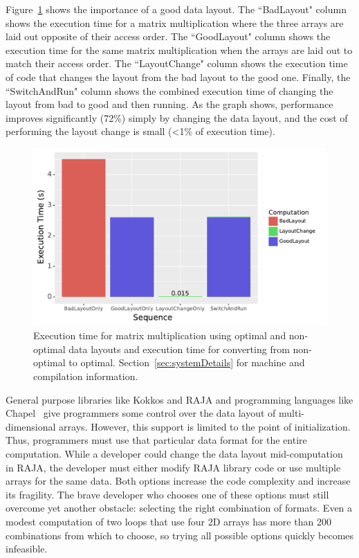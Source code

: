 \documentclass[sigconf,review=true]{acmart}
\begin{document}
Figure~\ref{IntroExample} shows the importance of a good data layout. 
The ``BadLayout" column shows the execution time for a matrix multiplication where the three arrays are laid out opposite of their access order. 
The ``GoodLayout" column shows the execution time for the same matrix multiplication when the arrays are laid out to match their access order.
The ``LayoutChange" column shows the execution time of code that changes the layout from the bad layout to the good one.
Finally, the ``SwitchAndRun" column shows the combined execution time of changing the layout from bad to good and then running.
As the graph shows, performance improves  significantly (72\%) simply by changing the data layout, and the cost of performing the layout change is small (<1\% of execution time). 

\begin{figure}
	\includegraphics[width=\columnwidth]{IntroExampleGraph.pdf}
	\caption{Execution time for matrix multiplication using optimal and non-optimal data layouts and execution time for converting from non-optimal to optimal. Section~\ref{sec:systemDetails} for machine and compilation information.}
	\label{IntroExample}
\end{figure}

General purpose libraries like Kokkos and RAJA and programming languages like Chapel~\cite{diaconescu2007approach} give programmers some control over the data layout of multi-dimensional arrays. However, this support is limited to the point of initialization.
Thus, programmers must use that particular data format for the entire computation.
While a developer could change the data layout mid-computation in RAJA, the developer must either modify RAJA library code or use multiple arrays for the same data. 
Both options increase the code complexity and increase its fragility.
The brave developer who chooses one of these options must still overcome yet another obstacle: selecting the right combination of formats.
Even a modest computation of two loops that use four 2D arrays has more than 200 combinations from which to choose, so trying all possible options quickly becomes infeasible. 
\end{document}
